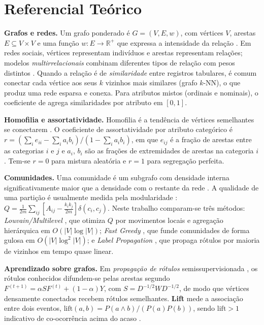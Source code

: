 \section{Referencial Teórico}
\label{referencial}

\textbf{Grafos e redes.} Um grafo ponderado é $G=(V,E,w)$, com vértices $V$, arestas $E \subseteq V\times V$ e uma função $w: E \rightarrow \mathbb{R}^+$ que expressa a intensidade da relação \citep{barabasi2016}. Em redes sociais, vértices representam indivíduos e arestas representam relações; modelos \textit{multirrelacionais} combinam diferentes tipos de relação com pesos distintos \citep{porto2025}. Quando a relação é de \textit{similaridade} entre registros tabulares, é comum conectar cada vértice aos seus $k$ vizinhos mais similares (grafo $k$-NN), o que produz uma rede esparsa e conexa. Para atributos mistos (ordinais e nominais), o coeficiente de \citet{gower1971} agrega similaridades por atributo em $[0,1]$.

\textbf{Homofilia e assortatividade.} Homofilia é a tendência de vértices semelhantes se conectarem \citep{mcpherson2001}. O coeficiente de assortatividade por atributo categórico \citep{newman2003} é
$r = (\sum_i e_{ii} - \sum_i a_i b_i)/(1-\sum_i a_i b_i)$,
em que $e_{ij}$ é a fração de arestas entre as categorias $i$ e $j$ e $a_i$, $b_i$ são as frações de extremidades de arestas na categoria $i$. Tem-se $r=0$ para mistura aleatória e $r=1$ para segregação perfeita.

\textbf{Comunidades.} Uma comunidade é um subgrafo com densidade interna significativamente maior que a densidade com o restante da rede \citep{fortunato2010}. A qualidade de uma partição é usualmente medida pela modularidade \citep{newman2004}:
$Q=\frac{1}{2m}\sum_{ij}\left[A_{ij}-\frac{k_ik_j}{2m}\right]\delta(c_i,c_j)$.
Neste trabalho comparam-se três métodos: \textit{Louvain/Multilevel} \citep{blondel2008}, que otimiza $Q$ por movimentos locais e agregação hierárquica em $O(|V|\log|V|)$; \textit{Fast Greedy} \citep{clauset2004}, que funde comunidades de forma gulosa em $O(|V|\log^2|V|)$; e \textit{Label Propagation} \citep{raghavan2007}, que propaga rótulos por maioria de vizinhos em tempo quase linear.

\textbf{Aprendizado sobre grafos.} Em \textit{propagação de rótulos} semissupervisionada \citep{zhou2004}, os rótulos conhecidos difundem-se pelas arestas segundo $F^{(t+1)}=\alpha S F^{(t)}+(1-\alpha)Y$, com $S=D^{-1/2}WD^{-1/2}$, de modo que vértices densamente conectados recebem rótulos semelhantes. \textbf{Lift} mede a associação entre dois eventos, $\mathrm{lift}(a,b)=P(a\wedge b)/(P(a)P(b))$, sendo $\mathrm{lift}>1$ indicativo de co-ocorrência acima do acaso \citep{agrawal1993}.

